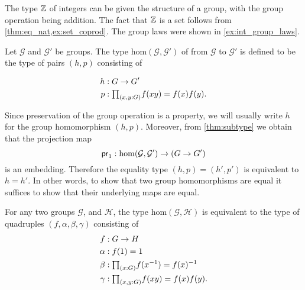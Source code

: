 \begin{eg}
The type $\mathbb{Z}$ of integers can be given the structure of a group, with the group operation being addition. The fact that $\mathbb{Z}$ is a set follows from \cref{thm:eq_nat,ex:set_coprod}. The group laws were shown in \cref{ex:int_group_laws}. 
\end{eg}

\begin{defn}
Let $\mathcal{G}$ and $\mathcal{G}'$ be groups. The type $\mathrm{hom}(\mathcal{G},\mathcal{G}')$ of  from $\mathcal{G}$ to $\mathcal{G}'$ is defined to be the type of pairs $(h,p)$ consisting of
\begin{samepage}
\begin{align*}
h & : G \to G' \\
p & : \prd{x,y:G} f(xy)=f(x)f(y).
\end{align*}
\end{samepage}
\end{defn}

\begin{rmk}
Since preservation of the group operation is a property, we will usually write $h$ for the group homomorphism $(h,p)$.
Moreover, from \cref{thm:subtype} we obtain that the projection map
\begin{equation*}
\mathsf{pr}_{1}:\mathrm{hom}(\mathcal{G},\mathcal{G}')\to (G\to G')
\end{equation*}
is an embedding. Therefore the equality type $(h,p)=(h',p')$ is equivalent to $h=h'$. In other words, to show that two group homomorphisms are equal it suffices to show that their underlying maps are equal.
\end{rmk}

\begin{lem}
For any two groups $\mathcal{G}$, and $\mathcal{H}$, the type $\mathrm{hom}(\mathcal{G},\mathcal{H})$ is equivalent to the type of quadruples $(f,\alpha,\beta,\gamma)$ consisting of
\begin{align*}
f & : G \to H \\
\alpha & : f(1)=1 \\
\beta & : \prd{x:G}f(x^{-1})=f(x)^{-1} \\
\gamma & : \prd{x,y:G} f(xy)=f(x)f(y).
\end{align*}
\end{lem}

